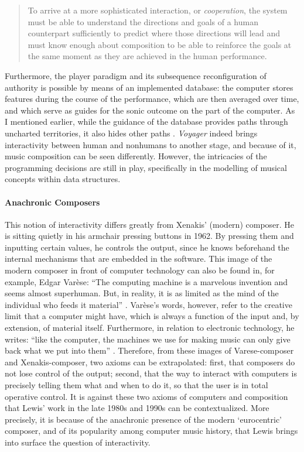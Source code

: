 \begin{quote}
	To arrive at a more sophisticated interaction, or \textit{cooperation}, the system must be able to understand the directions and goals of a human counterpart sufficiently to predict where those directions will lead and must know enough about composition to be able to reinforce the goals at the same moment as they are achieved in the human performance. \parencite[Chapter~8]{Row92:Int}
\end{quote}

Furthermore, the player paradigm and its subsequence reconfiguration of authority is possible by means of an implemented database: the computer stores features during the course of the performance, which are then averaged over time, and which serve as guides for the sonic outcome on the part of the computer. As I mentioned earlier, while the guidance of the database provides paths through uncharted territories, it also hides other paths . \textit{Voyager} indeed brings interactivity between human and nonhumans to another stage, and because of it, music composition can be seen differently. However, the intricacies of the programming decisions are still in play, specifically in the modelling of musical concepts within data structures.

\paragraph{Anachronic Composers}
This notion of interactivity differs greatly from Xenakis' (modern) composer. He is sitting quietly in his armchair pressing buttons in 1962. By pressing them and inputting certain values, he controls the output, since he knows beforehand the internal mechanisms that are embedded in the software. This image of the modern composer in front of computer technology can also be found in, for example, Edgar Varèse: ``The computing machine is a marvelous invention and seems almost superhuman. But, in reality, it is as limited as the mind of the individual who feeds it material'' \parencite[20]{Var04:The}. Varèse's words, however, refer to the creative limit that a computer might have, which is always a function of the input and, by extension, of material itself. Furthermore, in relation to electronic technology, he writes: ``like the computer, the machines we use for making music can only give back what we put into them'' \parencite[20]{Var04:The}. Therefore, from these images of Varese-composer and Xenakis-composer, two axioms can be extrapolated: first, that composers do not lose control of the output; second, that the way to interact with computers is precisely telling them what and when to do it, so that the user is in total operative control. It is against these two axioms of computers and composition that Lewis' work in the late 1980s and 1990s can be contextualized. More precisely, it is because of the anachronic presence of the modern `eurocentric' composer, and of its popularity among computer music history, that Lewis brings into surface the question of interactivity. 

